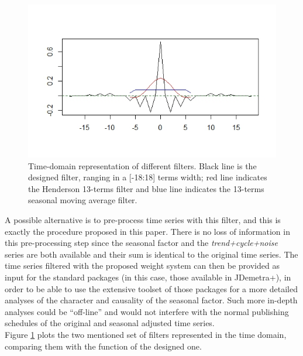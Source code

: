 \documentclass[english,blauw]{cbsdiscussionpaper}
\begin{document}
\begin{figure}[h]
\includegraphics[width=\linewidth]{../images/capitolo2/henderson_designed_ma.jpeg}
\caption{Time-domain representation of different filters. Black line is the designed filter, ranging in a [-18:18] terms width; red line indicates the Henderson 13-terms filter and blue line indicates the 13-terms seasonal moving average filter.}
\label{fig:henderson_designed_ma}
\end{figure}
A possible alternative is to pre-process time series with this filter, and this is exactly the procedure proposed in this paper. There is no loss of information in this pre-processing step since the seasonal factor and the \textit{trend+cycle+noise} series are both available and their sum is identical to the original time series. The time series filtered with the proposed weight system can then be provided as input for the standard packages (in this case, those available in JDemetra+), in order to be able to use the extensive toolset of those packages for a more detailed analyses of the character and causality of the seasonal factor. Such more in-depth analyses could be ``off-line'' and would not interfere with the normal publishing schedules of the original and seasonal adjusted time series.\\
Figure \ref{fig:henderson_designed_ma} plots the two mentioned set of filters represented in the time domain, comparing them with the function of the designed one.
\end{document}
